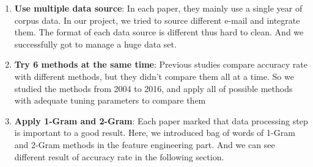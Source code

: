 \documentclass[10pt, letterpaper, titlepage]{article}
\begin{document}
\begin{enumerate}
	\item \textbf{Use multiple data source}: In each paper, they mainly use a single year of corpus data. In our project, we tried to source different e-mail and integrate them. The format of each data source is different thus hard to clean. And we successfully got to manage a huge data set. 
	\item \textbf{Try 6 methods at the same time}: Previous studies compare accuracy rate with different methods, but they didn't compare them all at a time. So we studied the methods from 2004 to 2016, and apply all of possible methods with adequate tuning parameters to compare them 
	\item \textbf{Apply 1-Gram and 2-Gram}: Each paper marked that data processing step is important to a good result. Here, we introduced bag of words of 1-Gram and 2-Gram methods in the feature engineering part. And we can see different result of accuracy rate in the following section.
\end{enumerate}
\end{document}

